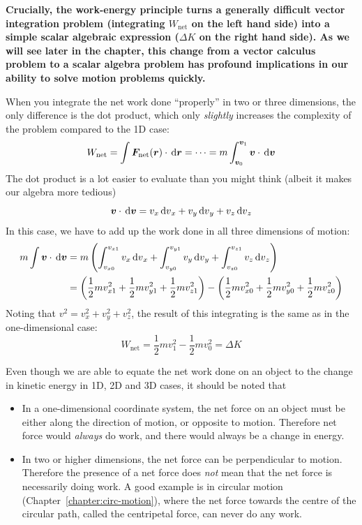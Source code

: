 \textbf{Crucially, the work-energy principle turns a generally difficult vector
integration problem (integrating $W_\text{net}$ on the left hand side) into a
simple scalar algebraic expression ($\Delta K$ on the right hand side). As we
will see later in the chapter, this change from a vector calculus problem to a
scalar algebra problem has profound implications in our ability to solve
motion problems quickly.}
\begin{remark}
  When you integrate the net work done ``properly'' in two or three dimensions,
  the only difference is the dot product, which only \emph{slightly} increases
  the complexity of the problem compared to the 1D case:
  \begin{equation*}
    W_\text{net}
    = \int\bm F_\text{net}(\bm r)\cdot\dl{\bm r}
    = \cdots = m\int_{\bm v_0}^{\bm v_1}\bm v\cdot\dl{\bm v}
  \end{equation*}
  The dot product is a lot easier to evaluate than you might think (albeit it
  makes our algebra more tedious)
  \begin{equation*}
    \bm v\cdot\dl{\bm v}=v_x\dl v_x+v_y\dl v_y+v_z\dl v_z
  \end{equation*}
  In this case, we have to add up the work done in all three dimensions of
  motion:
  \begin{align*}
    m\int\bm v\cdot\dl{\bm v}
    &=m\left(
    \int_{v_{x0}}^{v_{x1}} v_x\dl v_x +
    \int_{v_{y0}}^{v_{y1}} v_y\dl v_y +
    \int_{v_{z0}}^{v_{z1}} v_z\dl v_z\right)\\
    &=\left(\frac12mv_{x1}^2+\frac12mv_{y1}^2 + \frac12mv_{z1}^2\right)-
    \left(\frac12mv_{x0}^2+\frac12mv_{y0}^2 + \frac12mv_{z0}^2\right)
  \end{align*}
  Noting that $v^2=v_x^2+v_y^2+v_z^2$, the result of this integrating is the same
  as in the one-dimensional case:
  \begin{displaymath}
    W_\text{net}=\frac12mv_1^2-\frac12mv_0^2=\Delta K
  \end{displaymath}
\end{remark}
Even though we are able to equate the net work done on an object to the change
in kinetic energy in 1D, 2D and 3D cases, it should be noted that
\begin{itemize}[itemsep=6pt]
\item In a one-dimensional coordinate system, the net force on an object must
  be either along the direction of motion, or opposite to motion. Therefore net
  force would \emph{always} do work, and there would always be a change in
  energy.
\item In two or higher dimensions, the net force can be perpendicular
  to motion. Therefore the presence of a net force does \emph{not} mean that the
  net force is necessarily doing work. A good example is in circular motion
  (Chapter~\ref{chapter:circ-motion}), where the net force towards the centre of
  the circular path, called the centripetal force, can never do any work.
\end{itemize}


